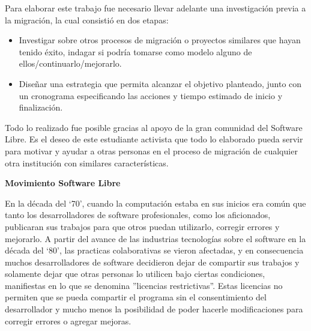 	
	\vspace{0,5cm}
	        
	
	Para elaborar este trabajo fue necesario llevar adelante una investigación 
	previa a la migración, la cual consistió en dos etapas:\par
	
	
	\begin{itemize}
	
	
	    \item Investigar sobre otros procesos de migración o proyectos similares que hayan tenido éxito, indagar si podría tomarse como modelo alguno de ellos/continuarlo/mejorarlo.
	
	        
	    \item Diseñar una estrategia que permita alcanzar el objetivo planteado, junto con un cronograma especificando las acciones y tiempo estimado de inicio y finalización.
	        
	        
	\end{itemize}
	
	
	Todo lo realizado fue posible gracias al apoyo de la gran comunidad del Software Libre. Es el deseo de este estudiante activista que todo lo elaborado pueda servir para motivar y ayudar a otras personas en el proceso de migración de cualquier otra institución con similares características.\par
	
	\clearpage
	
	\begin{center}
	
	    \textbf{Movimiento Software Libre}
	    
	\end{center}
	
	
	\vspace{0.2cm}
	
	
	En la década del ‘70’, cuando la computación estaba en sus inicios era común que tanto los desarrolladores de software profesionales, como los	aficionados, publicaran sus trabajos para que otros puedan utilizarlo, corregir errores y mejorarlo. A partir del avance de las industrias tecnologías sobre el software en la década del ‘80’, las practicas 
	colaborativas se vieron afectadas,  y en consecuencia muchos desarrolladores de software decidieron dejar de compartir sus trabajos y solamente dejar que otras personas lo utilicen bajo ciertas condiciones, manifiestas en lo que se denomina ''licencias restrictivas''. Estas licencias no permiten que se pueda compartir el programa sin el consentimiento del desarrollador y mucho menos la posibilidad de poder hacerle modificaciones para corregir errores o agregar mejoras.\par
	
